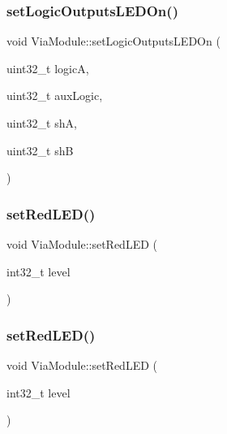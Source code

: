 \subsubsection{\texorpdfstring{set\+Logic\+Outputs\+L\+E\+D\+On()}{setLogicOutputsLEDOn()}\hspace{0.1cm}{\footnotesize\ttfamily [2/2]}}
{\footnotesize\ttfamily void Via\+Module\+::set\+Logic\+Outputs\+L\+E\+D\+On (\begin{DoxyParamCaption}\item[{uint32\+\_\+t}]{logicA,  }\item[{uint32\+\_\+t}]{aux\+Logic,  }\item[{uint32\+\_\+t}]{shA,  }\item[{uint32\+\_\+t}]{shB }\end{DoxyParamCaption})\hspace{0.3cm}{\ttfamily [inline]}}

\mbox{\label{class_via_module_a7a11c19ddf0c9a04061105a65d7c546b}} 
\subsubsection{\texorpdfstring{set\+Red\+L\+E\+D()}{setRedLED()}\hspace{0.1cm}{\footnotesize\ttfamily [1/2]}}
{\footnotesize\ttfamily void Via\+Module\+::set\+Red\+L\+ED (\begin{DoxyParamCaption}\item[{int32\+\_\+t}]{level }\end{DoxyParamCaption})\hspace{0.3cm}{\ttfamily [inline]}}

\mbox{\label{class_via_module_a7a11c19ddf0c9a04061105a65d7c546b}} 
\subsubsection{\texorpdfstring{set\+Red\+L\+E\+D()}{setRedLED()}\hspace{0.1cm}{\footnotesize\ttfamily [2/2]}}
{\footnotesize\ttfamily void Via\+Module\+::set\+Red\+L\+ED (\begin{DoxyParamCaption}\item[{int32\+\_\+t}]{level }\end{DoxyParamCaption})\hspace{0.3cm}{\ttfamily [inline]}}

